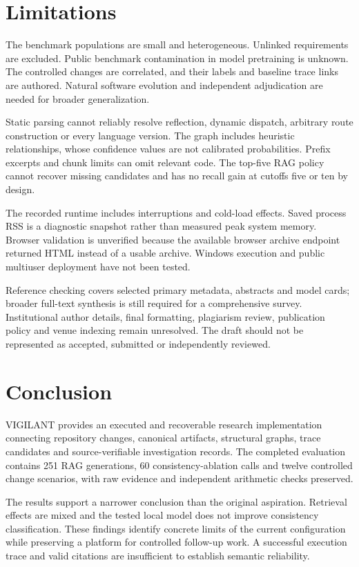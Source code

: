 \documentclass[
  11pt,
  a4paper,
]{report}
\begin{document}
\hypertarget{limitations}{%
\chapter{Limitations}\label{limitations}}

The benchmark populations are small and heterogeneous. Unlinked
requirements are excluded. Public benchmark contamination in model
pretraining is unknown. The controlled changes are correlated, and their
labels and baseline trace links are authored. Natural software evolution
and independent adjudication are needed for broader generalization.

Static parsing cannot reliably resolve reflection, dynamic dispatch,
arbitrary route construction or every language version. The graph
includes heuristic relationships, whose confidence values are not
calibrated probabilities. Prefix excerpts and chunk limits can omit
relevant code. The top-five RAG policy cannot recover missing candidates
and has no recall gain at cutoffs five or ten by design.

The recorded runtime includes interruptions and cold-load effects. Saved
process RSS is a diagnostic snapshot rather than measured peak system
memory. Browser validation is unverified because the available browser
archive endpoint returned HTML instead of a usable archive. Windows
execution and public multiuser deployment have not been tested.

Reference checking covers selected primary metadata, abstracts and model
cards; broader full-text synthesis is still required for a comprehensive
survey. Institutional author details, final formatting, plagiarism
review, publication policy and venue indexing remain unresolved. The
draft should not be represented as accepted, submitted or independently
reviewed.

\hypertarget{conclusion}{%
\chapter{Conclusion}\label{conclusion}}

VIGILANT provides an executed and recoverable research implementation
connecting repository changes, canonical artifacts, structural graphs,
trace candidates and source-verifiable investigation records. The
completed evaluation contains 251 RAG generations, 60
consistency-ablation calls and twelve controlled change scenarios, with
raw evidence and independent arithmetic checks preserved.

The results support a narrower conclusion than the original aspiration.
Retrieval effects are mixed and the tested local model does not improve
consistency classification. These findings identify concrete limits of
the current configuration while preserving a platform for controlled
follow-up work. A successful execution trace and valid citations are
insufficient to establish semantic reliability.
\end{document}
